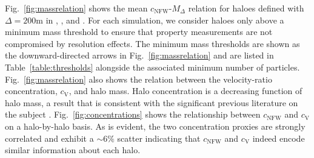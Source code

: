 \documentclass[usenatbib,fleqn]{mnras}
\begin{document}
Fig.~\ref{fig:massrelation} shows the mean $c_{\mathrm{NFW}}$-$M_{\Delta}$ relation for haloes defined with $\Delta=200$m in \simA, \simB, and \simC. For each simulation, we consider haloes only above a minimum mass threshold to ensure that property measurements are not compromised by resolution effects. The minimum mass thresholds are shown as the downward-directed arrows in Fig.~\ref{fig:massrelation} and are listed in Table~\ref{table:thresholds} alongside the associated minimum number of particles. Fig.~\ref{fig:massrelation} also shows the relation between the velocity-ratio concentration, $c_{\mathrm{V}}$, and halo mass. Halo concentration is a decreasing function of halo mass, a result that is consistent with the significant previous literature on the subject \citep[e.g.,][and references therein]{bullock_etal01, maccio_etal07,duffy_etal08,prada_etal12,klypin_etal16}.  Fig.~\ref{fig:concentrations} shows the relationship between $c_{\mathrm{NFW}}$ and $c_{\mathrm{V}}$ on a halo-by-halo basis. As is evident, the two concentration proxies are strongly correlated and exhibit a $\sim 6\%$ scatter indicating that $c_{\mathrm{NFW}}$ and $c_{\mathrm{V}}$ indeed encode similar information about each halo. 
\end{document}
